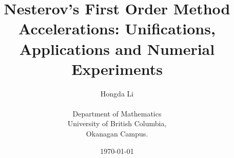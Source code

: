 \documentclass[12pt]{article}
\title{
    {
        \fontfamily{ptm}\selectfont 
        Nesterov's First Order Method Accelerations: Unifications, Applications  and Numerial Experiments
    }
}
\author{
    Hongda Li\\[3ex]\\ Department of Mathematics\\
	University of British Columbia,\\
	Okanagan Campus.
}
\date{\today}
\begin{document}

\maketitle
\tableofcontents
\pagebreak





\end{document}
